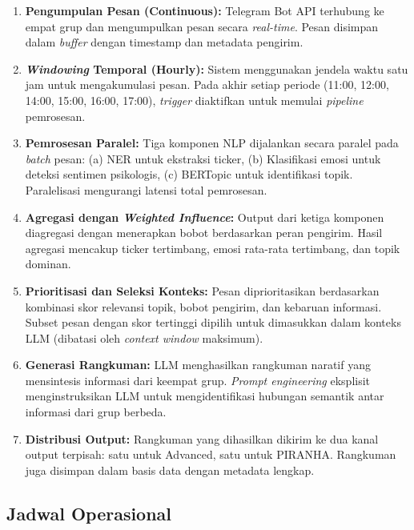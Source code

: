 \begin{enumerate}
\item \textbf{Pengumpulan Pesan (Continuous):} Telegram Bot API terhubung ke empat grup dan mengumpulkan pesan secara \textit{real-time}. Pesan disimpan dalam \textit{buffer} dengan timestamp dan metadata pengirim.

\item \textbf{\textit{Windowing} Temporal (Hourly):} Sistem menggunakan jendela waktu satu jam untuk mengakumulasi pesan. Pada akhir setiap periode (11:00, 12:00, 14:00, 15:00, 16:00, 17:00), \textit{trigger} diaktifkan untuk memulai \textit{pipeline} pemrosesan.

\item \textbf{Pemrosesan Paralel:} Tiga komponen NLP dijalankan secara paralel pada \textit{batch} pesan: (a) NER untuk ekstraksi ticker, (b) Klasifikasi emosi untuk deteksi sentimen psikologis, (c) BERTopic untuk identifikasi topik. Paralelisasi mengurangi latensi total pemrosesan.

\item \textbf{Agregasi dengan \textit{Weighted Influence}:} Output dari ketiga komponen diagregasi dengan menerapkan bobot berdasarkan peran pengirim. Hasil agregasi mencakup ticker tertimbang, emosi rata-rata tertimbang, dan topik dominan.

\item \textbf{Prioritisasi dan Seleksi Konteks:} Pesan diprioritasikan berdasarkan kombinasi skor relevansi topik, bobot pengirim, dan kebaruan informasi. Subset pesan dengan skor tertinggi dipilih untuk dimasukkan dalam konteks LLM (dibatasi oleh \textit{context window} maksimum).

\item \textbf{Generasi Rangkuman:} LLM menghasilkan rangkuman naratif yang mensintesis informasi dari keempat grup. \textit{Prompt engineering} eksplisit menginstruksikan LLM untuk mengidentifikasi hubungan semantik antar informasi dari grup berbeda.

\item \textbf{Distribusi Output:} Rangkuman yang dihasilkan dikirim ke dua kanal output terpisah: satu untuk Advanced, satu untuk PIRANHA. Rangkuman juga disimpan dalam basis data dengan metadata lengkap.
\end{enumerate}

\subsection{Jadwal Operasional}

